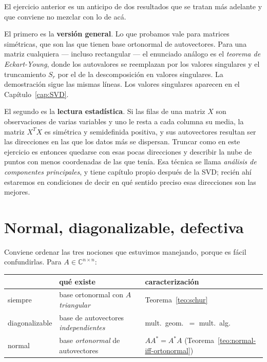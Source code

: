 \begin{observacion}\label{obs:hacia-rango-bajo}
El ejercicio anterior es un anticipo de dos resultados que se tratan más adelante y que
conviene no mezclar con lo de acá.

El primero es la \textbf{versión general}. Lo que probamos vale para matrices
simétricas, que son las que tienen base ortonormal de autovectores. Para una matriz
cualquiera --- incluso rectangular --- el enunciado análogo es el \emph{teorema de
Eckart-Young}, donde los autovalores se reemplazan por los valores singulares y el
truncamiento $S_r$ por el de la descomposición en valores singulares. La demostración
sigue las mismas líneas. Los valores singulares aparecen en el
Capítulo~\ref{cap:SVD}.

El segundo es la \textbf{lectura estadística}. Si las filas de una matriz $X$ son
observaciones de varias variables y uno le resta a cada columna su media, la matriz
$X^{T}X$ es simétrica y semidefinida positiva, y sus autovectores resultan ser las
direcciones en las que los datos más se dispersan. Truncar como en este ejercicio es
entonces quedarse con esas pocas direcciones y describir la nube de puntos con menos
coordenadas de las que tenía. Esa técnica se llama \emph{análisis de componentes
principales}, y tiene capítulo propio después de la SVD; recién ahí estaremos en
condiciones de decir en qué sentido preciso esas direcciones son las mejores.
\end{observacion}

\section{Normal, diagonalizable, defectiva}\label{sec:panorama}

Conviene ordenar las tres nociones que estuvimos manejando, porque es fácil confundirlas.
Para $A\in\mathbb{C}^{n\times n}$:

\begin{center}
\renewcommand{\arraystretch}{1.35}
\begin{tabular}{@{}lll@{}}
\hline
 & \textbf{qué existe} & \textbf{caracterización}\\
\hline
siempre & base ortonormal con $A$ \emph{triangular} & Teorema~\ref{teo:schur}\\
diagonalizable & base de autovectores \emph{independientes}
   & mult.\ geom.\ $=$ mult.\ alg.\\
normal & base \emph{ortonormal} de autovectores
   & $AA^{*}=A^{*}A$ (Teorema~\ref{teo:normal-iff-ortonormal})\\
\hline
\end{tabular}
\end{center}

